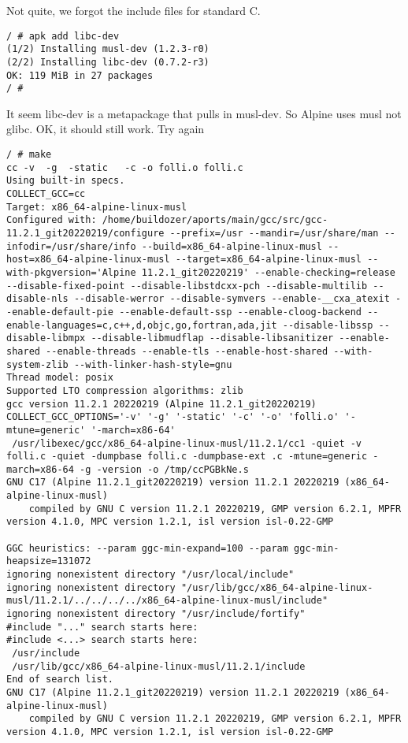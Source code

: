 \documentclass{article}  %
\begin{document}
 Not quite, we forgot the include files for standard C.
\begin{verbatim}
/ # apk add libc-dev
(1/2) Installing musl-dev (1.2.3-r0)
(2/2) Installing libc-dev (0.7.2-r3)
OK: 119 MiB in 27 packages
/ # 
\end{verbatim}
It seem libc-dev is a metapackage that pulls in musl-dev. So Alpine uses musl not glibc. OK, it should still work.
Try again
\begin{verbatim}
/ # make
cc -v  -g  -static   -c -o folli.o folli.c
Using built-in specs.
COLLECT_GCC=cc
Target: x86_64-alpine-linux-musl
Configured with: /home/buildozer/aports/main/gcc/src/gcc-11.2.1_git20220219/configure --prefix=/usr --mandir=/usr/share/man --infodir=/usr/share/info --build=x86_64-alpine-linux-musl --host=x86_64-alpine-linux-musl --target=x86_64-alpine-linux-musl --with-pkgversion='Alpine 11.2.1_git20220219' --enable-checking=release --disable-fixed-point --disable-libstdcxx-pch --disable-multilib --disable-nls --disable-werror --disable-symvers --enable-__cxa_atexit --enable-default-pie --enable-default-ssp --enable-cloog-backend --enable-languages=c,c++,d,objc,go,fortran,ada,jit --disable-libssp --disable-libmpx --disable-libmudflap --disable-libsanitizer --enable-shared --enable-threads --enable-tls --enable-host-shared --with-system-zlib --with-linker-hash-style=gnu
Thread model: posix
Supported LTO compression algorithms: zlib
gcc version 11.2.1 20220219 (Alpine 11.2.1_git20220219) 
COLLECT_GCC_OPTIONS='-v' '-g' '-static' '-c' '-o' 'folli.o' '-mtune=generic' '-march=x86-64'
 /usr/libexec/gcc/x86_64-alpine-linux-musl/11.2.1/cc1 -quiet -v folli.c -quiet -dumpbase folli.c -dumpbase-ext .c -mtune=generic -march=x86-64 -g -version -o /tmp/ccPGBkNe.s
GNU C17 (Alpine 11.2.1_git20220219) version 11.2.1 20220219 (x86_64-alpine-linux-musl)
	compiled by GNU C version 11.2.1 20220219, GMP version 6.2.1, MPFR version 4.1.0, MPC version 1.2.1, isl version isl-0.22-GMP

GGC heuristics: --param ggc-min-expand=100 --param ggc-min-heapsize=131072
ignoring nonexistent directory "/usr/local/include"
ignoring nonexistent directory "/usr/lib/gcc/x86_64-alpine-linux-musl/11.2.1/../../../../x86_64-alpine-linux-musl/include"
ignoring nonexistent directory "/usr/include/fortify"
#include "..." search starts here:
#include <...> search starts here:
 /usr/include
 /usr/lib/gcc/x86_64-alpine-linux-musl/11.2.1/include
End of search list.
GNU C17 (Alpine 11.2.1_git20220219) version 11.2.1 20220219 (x86_64-alpine-linux-musl)
	compiled by GNU C version 11.2.1 20220219, GMP version 6.2.1, MPFR version 4.1.0, MPC version 1.2.1, isl version isl-0.22-GMP


\end{verbatim}
\end{document}
